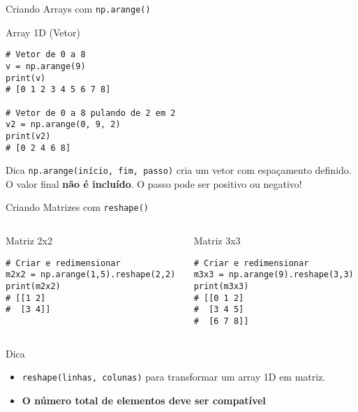 \begin{frame}[fragile]{Criando Arrays com \texttt{np.arange()}}
    \begin{block}{Array 1D (Vetor)}
        \begin{verbatim}
# Vetor de 0 a 8
v = np.arange(9)
print(v)
# [0 1 2 3 4 5 6 7 8]

# Vetor de 0 a 8 pulando de 2 em 2
v2 = np.arange(0, 9, 2)
print(v2)
# [0 2 4 6 8]
\end{verbatim}
    \end{block}

    \begin{alertblock}{Dica}
        \texttt{np.arange(início, fim, passo)} cria um vetor com espaçamento definido.\\
        O valor final \textbf{não é incluído}. O passo pode ser positivo ou negativo!
    \end{alertblock}
\end{frame}


\begin{frame}[fragile]{Criando Matrizes com \texttt{reshape()}}
    \begin{columns}[T]
        \begin{column}{0.5\textwidth}
            \begin{block}{Matriz 2x2}
                \begin{verbatim}
# Criar e redimensionar
m2x2 = np.arange(1,5).reshape(2,2)
print(m2x2)
# [[1 2]
#  [3 4]]
\end{verbatim}
            \end{block}
        \end{column}

        \begin{column}{0.5\textwidth}
            \begin{block}{Matriz 3x3}
                \begin{verbatim}
# Criar e redimensionar
m3x3 = np.arange(9).reshape(3,3)
print(m3x3)
# [[0 1 2]
#  [3 4 5]
#  [6 7 8]]
\end{verbatim}
            \end{block}
        \end{column}
    \end{columns}

    \begin{alertblock}{Dica}
        \begin{itemize}
            \item \texttt{reshape(linhas, colunas)} para transformar um array 1D em matriz.

            \item \textbf{O número total de elementos deve ser compatível}

        \end{itemize}
    \end{alertblock}
\end{frame}


